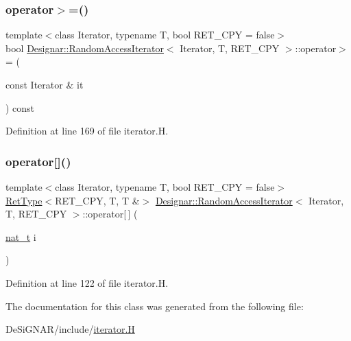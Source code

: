 \subsubsection{\texorpdfstring{operator$>$=()}{operator>=()}}
{\footnotesize\ttfamily template$<$class Iterator, typename T, bool R\+E\+T\+\_\+\+C\+PY = false$>$ \\
bool \hyperlink{class_designar_1_1_random_access_iterator}{Designar\+::\+Random\+Access\+Iterator}$<$ Iterator, T, R\+E\+T\+\_\+\+C\+PY $>$\+::operator$>$= (\begin{DoxyParamCaption}\item[{const Iterator \&}]{it }\end{DoxyParamCaption}) const\hspace{0.3cm}{\ttfamily [inline]}}



Definition at line 169 of file iterator.\+H.

\mbox{\label{class_designar_1_1_random_access_iterator_a19e24a37b546cb41aed275ff61fbc0b7}} 
\subsubsection{\texorpdfstring{operator[]()}{operator[]()}}
{\footnotesize\ttfamily template$<$class Iterator, typename T, bool R\+E\+T\+\_\+\+C\+PY = false$>$ \\
\hyperlink{namespace_designar_ab937f9c4bf5f1d0e65dbc616245d50ee}{Ret\+Type}$<$R\+E\+T\+\_\+\+C\+PY, T, T \&$>$ \hyperlink{class_designar_1_1_random_access_iterator}{Designar\+::\+Random\+Access\+Iterator}$<$ Iterator, T, R\+E\+T\+\_\+\+C\+PY $>$\+::operator\mbox{[}$\,$\mbox{]} (\begin{DoxyParamCaption}\item[{\hyperlink{namespace_designar_aa72662848b9f4815e7bf31a7cf3e33d1}{nat\+\_\+t}}]{i }\end{DoxyParamCaption})\hspace{0.3cm}{\ttfamily [inline]}}



Definition at line 122 of file iterator.\+H.



The documentation for this class was generated from the following file\+:\begin{DoxyCompactItemize}
\item 
De\+Si\+G\+N\+A\+R/include/\hyperlink{iterator_8_h}{iterator.\+H}\end{DoxyCompactItemize}
